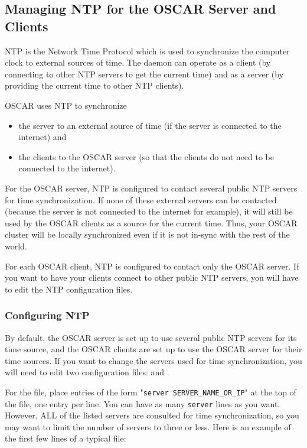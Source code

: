 
\subsection{Managing NTP for the OSCAR Server and Clients}
\label{app:ntp-overview}

NTP is the Network Time Protocol which is used to synchronize the computer
clock to external sources of time.  The  daemon can operate as a
client (by connecting to other NTP servers to get the current time) and as a
server (by providing the current time to other NTP clients). 

\bigskip

OSCAR uses NTP to synchronize
\begin{itemize}
\item the server to an external source of time (if the server is
      connected to the internet) and
\item the clients to the OSCAR server (so that the clients do not need to be 
      connected to the internet).
\end{itemize}

For the OSCAR server, NTP is configured to contact several public NTP
servers for time synchronization.  If none of these external servers can be
contacted (because the server is not connected to the internet for example),
it will still be used by the OSCAR clients as a source for the current time.
Thus, your OSCAR cluster will be locally synchronized even if it is not
in-sync with the rest of the world.

For each OSCAR client, NTP is configured to contact only the OSCAR server.
If you want to have your clients connect to other public NTP servers,
you will have to edit the NTP configuration files.

\subsubsection{Configuring NTP}

By default, the OSCAR server is set up to use several public NTP servers for
its time source, and the OSCAR clients are set up to use the OSCAR server for
their time sources.  If you want to change the servers used for time
synchronization, you will need to edit two configuration files:
 and .

For the  file, place entries of the form "{\tt server
SERVER\_NAME\_OR\_IP}" at the top of the file, one entry per line.  You can
have as many {\tt server} lines as you want.  However, ALL of the listed
servers are consulted for time synchronization, so you may want to limit the
number of servers to three or less.  Here is an example of the first few
lines of a typical  file:

